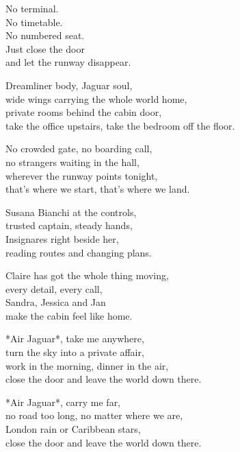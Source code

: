 \begin{lyrics}

No terminal.\\
No timetable.\\
No numbered seat.\\
Just close the door\\
and let the runway disappear.


Dreamliner body, Jaguar soul,\\
wide wings carrying the whole world home,\\
private rooms behind the cabin door,\\
take the office upstairs, take the bedroom off the floor.

No crowded gate, no boarding call,\\
no strangers waiting in the hall,\\
wherever the runway points tonight,\\
that's where we start, that's where we land.


Susana Bianchi at the controls,\\
trusted captain, steady hands,\\
Insignares right beside her,\\
reading routes and changing plans.

Claire has got the whole thing moving,\\
every detail, every call,\\
Sandra, Jessica and Jan\\
make the cabin feel like home.


*Air Jaguar*, take me anywhere,\\
turn the sky into a private affair,\\
work in the morning, dinner in the air,\\
close the door and leave the world down there.

*Air Jaguar*, carry me far,\\
no road too long, no matter where we are,\\
London rain or Caribbean stars,\\
close the door and leave the world down there.



\end{lyrics}
